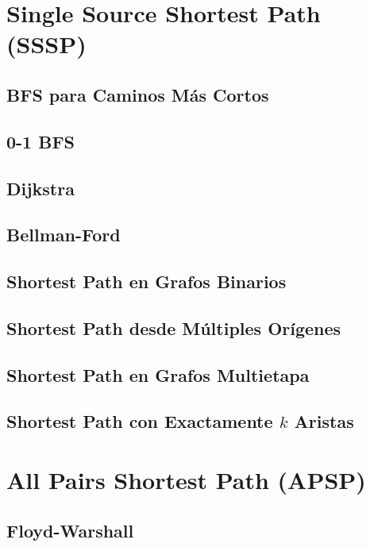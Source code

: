 \documentclass[10pt,a4paper,twocolumn]{article}
\begin{document}
\section{Single Source Shortest Path (SSSP)}

\subsection{BFS para Caminos Más Cortos}

\subsection{0-1 BFS}

\subsection{Dijkstra}

\subsection{Bellman-Ford}

\subsection{Shortest Path en Grafos Binarios}

\subsection{Shortest Path desde Múltiples Orígenes}

\subsection{Shortest Path en Grafos Multietapa}

\subsection{Shortest Path con Exactamente $k$ Aristas}



\section{All Pairs Shortest Path (APSP)}

\subsection{Floyd-Warshall}
\end{document}
